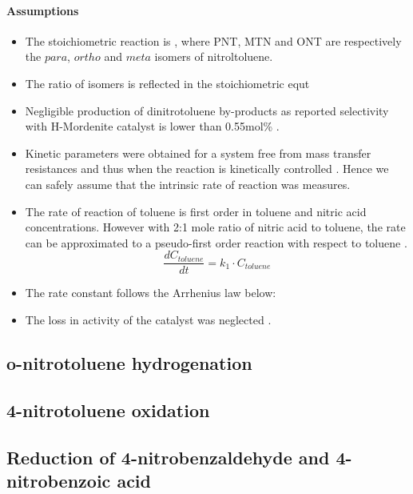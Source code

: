 \paragraph{Assumptions}
\begin{itemize}
    \item The stoichiometric reaction is , where PNT, MTN and ONT are respectively the $para$, $ortho$ and $meta$ isomers of nitroltoluene.
    \item The ratio of isomers is reflected in the stoichiometric equt
    \item Negligible production of dinitrotoluene by-products as reported selectivity with H-Mordenite catalyst is lower than 0.55mol\% \cite{jeeru_kinetics_2018}.
    \item Kinetic parameters were obtained for a system free from mass transfer resistances and thus when the reaction is kinetically controlled \cite{jeeru_kinetics_2018}. Hence we can safely assume that the intrinsic rate of reaction was measures.
    \item The rate of reaction of toluene is first order in toluene and nitric acid concentrations. However with 2:1 mole ratio of nitric acid to toluene, the rate can be approximated to a pseudo-first order reaction with respect to toluene \cite{jeeru_kinetics_2018}.
    \begin{equation}
    \frac{dC_{toluene}}{dt}=k_1 \cdot C_{toluene} 
    \end{equation}
    \item The rate constant follows the Arrhenius law below:
    \begin{equation}
        
    \end{equation}
    \item The loss in activity of the catalyst was neglected \cite{jeeru_kinetics_2018}.
\end{itemize}





\subsection{o-nitrotoluene hydrogenation}

\subsection{4-nitrotoluene oxidation}

\subsection{Reduction of 4-nitrobenzaldehyde and 4-nitrobenzoic acid}
